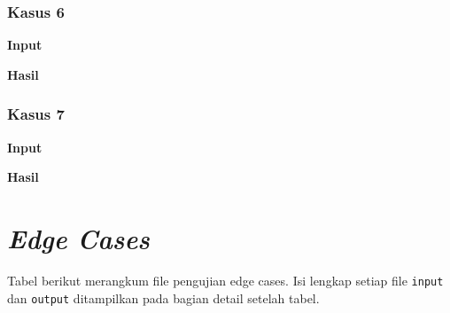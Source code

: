 \subsubsection*{Kasus 6}
\textbf{Input}\par

\textbf{Hasil}\par


\subsubsection*{Kasus 7}
\textbf{Input}\par

\textbf{Hasil}\par


\section{\textit{Edge Cases}}
Tabel berikut merangkum file pengujian edge cases. Isi lengkap setiap file \texttt{input} dan \texttt{output} ditampilkan pada bagian detail setelah tabel.


